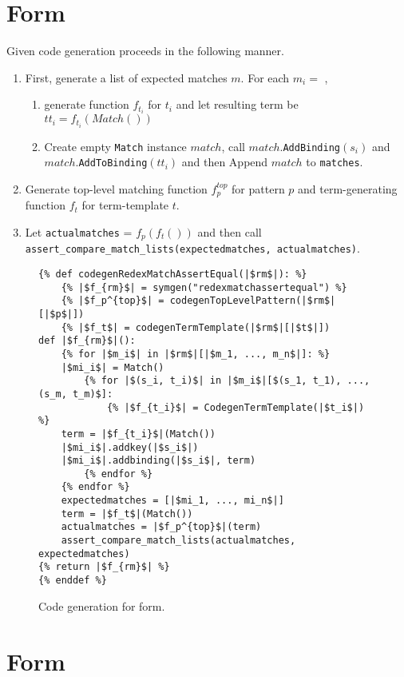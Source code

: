 \section{\RedexMatchAssertEqualNoArgs \space Form}
Given \RedexMatchAssertEqual code generation proceeds in the following manner.

\begin{enumerate}
\item First, generate a list of expected matches $m$. For each $m_i =$ \Match, 
\begin{enumerate}
\item generate function $f_{t_i}$ for $t_i$ and let resulting term be $tt_i = f_{t_i}(Match())$ 
\item Create empty \texttt{Match} instance $match$, call $match$.\texttt{AddBinding}$(s_i)$ and $match$.\texttt{AddToBinding}$(tt_i)$ and then Append $match$ to \texttt{matches}.
\end{enumerate}
\item Generate top-level matching function $f_p^{top}$ for pattern $p$ and term-generating function $f_t$ for term-template $t$.
\item Let \texttt{actualmatches} = $f_p(f_t())$ and then call \texttt{assert\_compare\_match\_lists(expectedmatches, actualmatches)}.
\end{enumerate}

\begin{figure}[h]
\begin{verbatim}
{% def codegenRedexMatchAssertEqual(|$rm$|): %}
	{% |$f_{rm}$| = symgen("redexmatchassertequal") %}
	{% |$f_p^{top}$| = codegenTopLevelPattern(|$rm$|[|$p$|])
	{% |$f_t$| = codegenTermTemplate(|$rm$|[|$t$|])
def |$f_{rm}$|():
	{% for |$m_i$| in |$rm$|[|$m_1, ..., m_n$|]: %}
	|$mi_i$| = Match()
		{% for |$(s_i, t_i)$| in |$m_i$|[$(s_1, t_1), ..., (s_m, t_m)$]:
			{% |$f_{t_i}$| = CodegenTermTemplate(|$t_i$|) %}
	term = |$f_{t_i}$|(Match())
	|$mi_i$|.addkey(|$s_i$|)
	|$mi_i$|.addbinding(|$s_i$|, term)
		{% endfor %}
	{% endfor %}
	expectedmatches = [|$mi_1, ..., mi_n$|]
	term = |$f_t$|(Match())
	actualmatches = |$f_p^{top}$|(term)
	assert_compare_match_lists(actualmatches, expectedmatches)
{% return |$f_{rm}$| %}
{% enddef %}
\end{verbatim} 
\caption{Code generation for \RedexMatchAssertEqualNoArgs \space form.}
\label{codegen-redexmatch}
\end{figure}

\section{\TermLetAssertEqualNoArgs \space Form}

